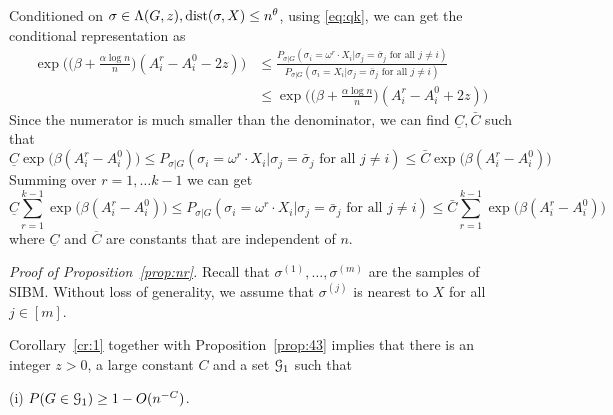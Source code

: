 \documentclass{article}
\begin{document}
\begin{remark}
	Conditioned on $\sigma\in \Lambda(G,z) ,\operatorname{dist}(\sigma, X) \le n^{\theta} $,
	using \eqref{eq:qk}, we can get the conditional representation as
	\begin{align*}
	\exp\Big(\big(\beta+\frac{\alpha\log n}{n} \big) (A^r_i-A^0_i - 2z) \Big) & \le 
	\frac{P_{\sigma|G}(\sigma_i= \omega^r \cdot X_i | \sigma_j = \bar{\sigma}_j \textrm{ for all } j \neq i  )}
	{P_{\sigma|G}(\sigma_i= X_i | \sigma_j = \bar{\sigma}_j \textrm{ for all } j \neq i  )}
	 \\
	& \le \exp\Big(\big(\beta+\frac{\alpha\log n}{n} \big) (A^r_i-A^0_i + 2z) \Big)
	\end{align*}
	Since the numerator is much smaller than the denominator, we can find $\underline{C}, \bar{C}$ such that
	$$
	\underline{C}\exp\Big(\beta(A^r_i-A^0_i) \Big)  \le 
	P_{\sigma|G}(\sigma_i = \omega^r \cdot X_i | \sigma_j = \bar{\sigma}_j \textrm{ for all } j \neq i )
	\le \bar{C} \exp\Big(\beta (A^r_i-A^0_i ) \Big) 
	$$
	Summing over $r=1, \dots k-1$ we can get
	\begin{equation} \label{eq:qke}
	\underline{C}\sum_{r=1}^{k-1}\exp\Big(\beta(A^r_i-A^0_i) \Big)  \le 
	P_{\sigma|G}(\sigma_i = \omega^r \cdot X_i | \sigma_j = \bar{\sigma}_j \textrm{ for all } j \neq i )
	\le \bar{C} \sum_{r=1}^{k-1}\exp\Big(\beta (A^r_i-A^0_i ) \Big) 
	\end{equation}
	where $\underline{C}$ and $\overline{C}$ are constants that are independent of $n$.
\end{remark}

\noindent
{\em Proof of Proposition~\ref{prop:nr}.}
Recall that $\sigma^{(1)},\dots,\sigma^{(m)}$ are the samples of SIBM.
Without loss of generality, we assume that 
$\sigma^{(j)}$ is nearest to $X$ for all $j\in[m]$. 

Corollary~\ref{cr:1} together with Proposition~\ref{prop:43} implies that there is an integer $z>0$,
a large constant $C$ and a set $\mathcal{G}_{1}$ such that

\noindent (i)
$P(G\in\mathcal{G}_{1}) \ge 1- O(n^{-C})$.
\end{document}
